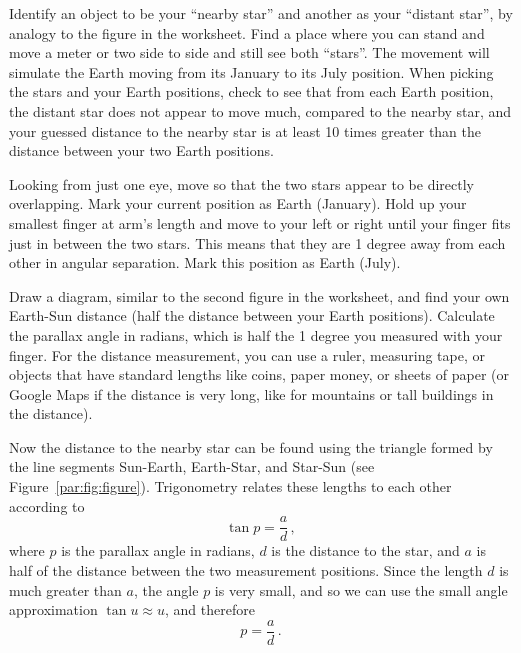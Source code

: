 \begin{steps}
	\item Identify an object to be your ``nearby star'' and another as your ``distant star'', by analogy to the figure in the worksheet. Find a place where you can stand and move a meter or two side to side and still see both ``stars''. The movement will simulate the Earth moving from its January to its July position. When picking the stars and your Earth positions, check to see that from each Earth position, the distant star does not appear to move much, compared to the nearby star, and your guessed distance to the nearby star is at least 10 times greater than the distance between your two Earth positions.
	
	\item Looking from just one eye, move so that the two stars appear to be directly overlapping. Mark your current position as Earth (January). Hold up your smallest finger at arm's length and move to your left or right until your finger fits just in between the two stars. This means that they are 1 degree away from each other in angular separation. Mark this position as Earth (July).
	
	\item Draw a diagram, similar to the second figure in the worksheet, and find your own Earth-Sun distance (half the distance between your Earth positions). Calculate the parallax angle in radians, which is half the 1 degree you measured with your finger. For the distance measurement, you can use a ruler, measuring tape, or objects that have standard lengths like coins, paper money, or sheets of paper (or Google Maps if the distance is very long, like for mountains or tall buildings in the distance).
\end{steps}
	
Now the distance to the nearby star can be found using the triangle formed by the line segments Sun-Earth, Earth-Star, and Star-Sun (see Figure~\ref{par:fig:figure}). Trigonometry relates these lengths to each other according to
\begin{equation}
	\tan p = \frac{a}{d}\,,
\end{equation}
where $p$ is the parallax angle in radians, $d$ is the distance to the star, and $a$ is half of the distance between the two measurement positions. Since the length $d$ is much greater than $a$, the angle $p$ is very small, and so we can use the small angle approximation $\tan u \approx u$, and therefore
\begin{equation}\label{par:eq:pad}
	p = \frac{a}{d}\,.
\end{equation}

